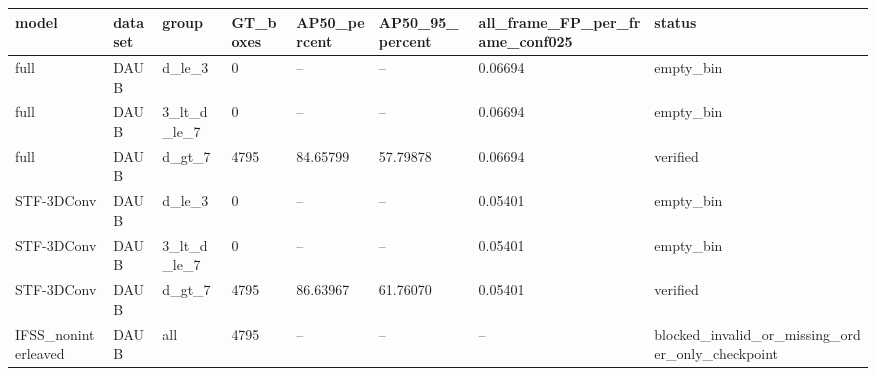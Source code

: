 \begin{tabular}{llllllll}
\hline
model & dataset & group & GT\_boxes & AP50\_percent & AP50\_95\_percent & all\_frame\_FP\_per\_frame\_conf025 & status \\
\hline
full & DAUB & d\_le\_3 & 0 & -- & -- & 0.06694 & empty\_bin \\
full & DAUB & 3\_lt\_d\_le\_7 & 0 & -- & -- & 0.06694 & empty\_bin \\
full & DAUB & d\_gt\_7 & 4795 & 84.65799 & 57.79878 & 0.06694 & verified \\
STF-3DConv & DAUB & d\_le\_3 & 0 & -- & -- & 0.05401 & empty\_bin \\
STF-3DConv & DAUB & 3\_lt\_d\_le\_7 & 0 & -- & -- & 0.05401 & empty\_bin \\
STF-3DConv & DAUB & d\_gt\_7 & 4795 & 86.63967 & 61.76070 & 0.05401 & verified \\
IFSS\_noninterleaved & DAUB & all & 4795 & -- & -- & -- & blocked\_invalid\_or\_missing\_order\_only\_checkpoint \\
\hline
\end{tabular}
